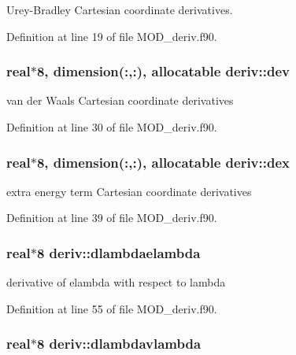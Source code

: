 Urey-\/\-Bradley Cartesian coordinate derivatives. 



Definition at line 19 of file M\-O\-D\-\_\-deriv.\-f90.

\hypertarget{classderiv_a5702b7756c4db2eaac0a462ea67fa477}{
\subsubsection[{dev}]{\setlength{\rightskip}{0pt plus 5cm}real$\ast$8, dimension(\-:,\-:), allocatable deriv\-::dev}}\label{classderiv_a5702b7756c4db2eaac0a462ea67fa477}


van der Waals Cartesian coordinate derivatives 



Definition at line 30 of file M\-O\-D\-\_\-deriv.\-f90.

\hypertarget{classderiv_a1151a4b1b1f0c054ae48e2c629cdd22a}{
\subsubsection[{dex}]{\setlength{\rightskip}{0pt plus 5cm}real$\ast$8, dimension(\-:,\-:), allocatable deriv\-::dex}}\label{classderiv_a1151a4b1b1f0c054ae48e2c629cdd22a}


extra energy term Cartesian coordinate derivatives 



Definition at line 39 of file M\-O\-D\-\_\-deriv.\-f90.

\hypertarget{classderiv_a0122c85565ea213dfaaee75053d1d14f}{
\subsubsection[{dlambdaelambda}]{\setlength{\rightskip}{0pt plus 5cm}real$\ast$8 deriv\-::dlambdaelambda}}\label{classderiv_a0122c85565ea213dfaaee75053d1d14f}


derivative of elambda with respect to lambda 



Definition at line 55 of file M\-O\-D\-\_\-deriv.\-f90.

\hypertarget{classderiv_a8a01f4e537a4ec3b2fb825517bfccf42}{
\subsubsection[{dlambdavlambda}]{\setlength{\rightskip}{0pt plus 5cm}real$\ast$8 deriv\-::dlambdavlambda}}\label{classderiv_a8a01f4e537a4ec3b2fb825517bfccf42}


